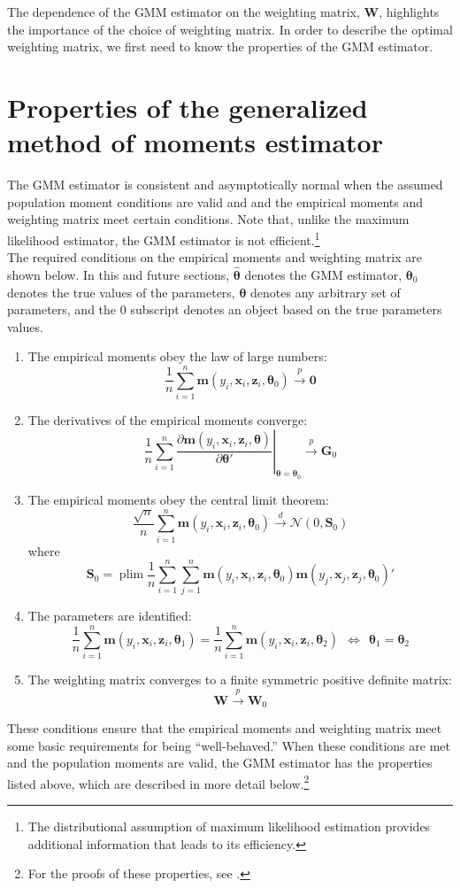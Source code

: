 \documentclass[11pt,letterpaper]{article}
\DeclareMathOperator*{\plim}{plim}
\begin{document}
\noindent The dependence of the GMM estimator on the weighting matrix, $\bm{W}$, highlights the importance of the choice of weighting matrix. In order to describe the optimal weighting matrix, we first need to know the properties of the GMM estimator.

\section{Properties of the generalized method of moments estimator}

The GMM estimator is consistent and asymptotically normal when the assumed population moment conditions are valid and and the empirical moments and weighting matrix meet certain conditions. Note that, unlike the maximum likelihood estimator, the GMM estimator is not efficient.\footnote{The distributional assumption of maximum likelihood estimation provides additional information that leads to its efficiency.} \\

\noindent The required conditions on the empirical moments and weighting matrix are shown below. In this and future sections, $\widehat{\bm{\theta}}$ denotes the GMM estimator, $\bm{\theta}_0$ denotes the true values of the parameters, $\bm{\theta}$ denotes any arbitrary set of parameters, and the $0$ subscript denotes an object based on the true parameters values. 
\begin{enumerate}
	\item The empirical moments obey the law of large numbers:
	$$\frac{1}{n} \sum_{i = 1}^n \bm{m}(y_i, \bm{x}_i, \bm{z}_i, \bm{\theta}_0) \overset{p}{\rightarrow} \bm{0}$$
	\item The derivatives of the empirical moments converge:
	$$\frac{1}{n} \sum_{i = 1}^n \left. \frac{\partial \bm{m}(y_i, \bm{x}_i, \bm{z}_i, \bm{\theta})}{\partial \bm{\theta}'} \right\vert_{\bm{\theta} = \bm{\theta}_0} \overset{p}{\rightarrow} \bm{G}_0$$
	\item The empirical moments obey the central limit theorem:
	$$\frac{\sqrt{n}}{n} \sum_{i = 1}^n \bm{m}(y_i, \bm{x}_i, \bm{z}_i, \bm{\theta}_0) \overset{d}{\rightarrow} \mathcal{N}(0, \bm{S}_0)$$
	where
	$$\bm{S}_0 = \plim \frac{1}{n} \sum_{i = 1}^n \sum_{j = 1}^n \bm{m}(y_i, \bm{x}_i, \bm{z}_i, \bm{\theta}_0) \bm{m}(y_j, \bm{x}_j, \bm{z}_j, \bm{\theta}_0)'$$
	\item The parameters are identified:
	$$\frac{1}{n} \sum_{i = 1}^n \bm{m}(y_i, \bm{x}_i, \bm{z}_i, \bm{\theta}_1) = \frac{1}{n} \sum_{i = 1}^n \bm{m}(y_i, \bm{x}_i, \bm{z}_i, \bm{\theta}_2) ~~\Leftrightarrow~~ \bm{\theta}_1 = \bm{\theta}_2$$
	\item The weighting matrix converges to a finite symmetric positive definite matrix:
	$$\bm{W} \overset{p}{\rightarrow} \bm{W}_0$$
\end{enumerate}
These conditions ensure that the empirical moments and weighting matrix meet some basic requirements for being ``well-behaved.'' When these conditions are met and the population moments are valid, the GMM estimator has the properties listed above, which are described in more detail below.\footnote{For the proofs of these properties, see .}
\end{document}
